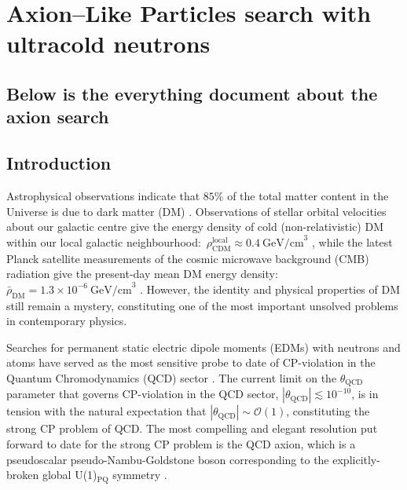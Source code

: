 \chapter{Axion--Like Particles search with ultracold neutrons}

\label{ch:axions}


\section{Below is the everything document about the axion search}

\section{Introduction}
\label{Sec:Introduction}

Astrophysical observations indicate that $85 \%$ of the total matter content in the Universe is due to dark matter (DM) \cite{Planck2015}.
Observations of stellar orbital velocities about our galactic centre give the energy density of cold (non-relativistic) DM within our local galactic neighbourhood:~$\rho_{\textrm{CDM}}^{\textrm{local}} \approx 0.4~\textrm{GeV/cm}^3$ \cite{Catena2010}, while the latest Planck satellite measurements of the cosmic microwave background (CMB) radiation give the present-day mean DM energy density:~$\bar{\rho}_{\textrm{DM}} = 1.3 \times 10^{-6}~\textrm{GeV/cm}^3$ \cite{Planck2015}.
However, the identity and physical properties of DM still remain a mystery, constituting one of the most important unsolved problems in contemporary physics.

Searches for permanent static electric dipole moments (EDMs) with neutrons \cite{Baker2006,Serebrov2014,Pendlebury2015} and atoms \cite{Griffith2009,Heckel2016} have served as the most sensitive probe to date of CP-violation in the Quantum Chromodynamics (QCD) sector \cite{Ginges2004Review,Pospelov2005Review,Engel2013Review,Roberts2015Review}.
The current limit on the $\theta_{\textrm{QCD}}$ parameter that governs CP-violation in the QCD sector, $\left|\theta_{\textrm{QCD}} \right| \lesssim 10^{-10}$, is in tension with the natural expectation that $\left| \theta_{\textrm{QCD}} \right| \sim \mathcal{O}(1)$, constituting the strong CP problem of QCD.
The most compelling and elegant resolution put forward to date for the strong CP problem is the QCD axion, which is a pseudoscalar pseudo-Nambu-Goldstone boson corresponding to the explicitly-broken global U(1)$_{\textrm{PQ}}$ symmetry \cite{PQ1977A,Weinberg1978,Wilczek1978,Kim1979,Zakharov1980,Zhitnitsky1980,Srednicki1981}.

